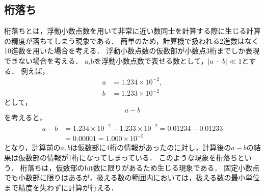 \subsection{桁落ち}
桁落ちとは，浮動小数点数を用いて非常に近い数同士を計算する際に生じる計算の精度が落ちてしまう現象である．
簡単のため，計算機で扱われる2進数はなく10進数を用いた場合を考える．
浮動小数点数の仮数部が小数点3桁までしか表現できない場合を考える．
a,bを浮動小数点数で表せる数として，$|a - b| \ll 1$とする．
例えば，
\begin{align*}
    a &= 1.234 \times 10^{-2}, \\
    b &= 1.233 \times 10^{-2}
\end{align*}
として，
\begin{equation*}
    a - b
\end{equation*}
を考えると，
\begin{align*}
    a - b &= 1.234 \times 10^{-2} - 1.233 \times 10^{-2} = 0.01234 - 0.01233 \\
    &= 0.00001 = 1.000 \times 10^{-5}
\end{align*}
となり，計算前の$a,b$は仮数部に4桁の情報があったのに対し，計算後の$a-b$の結果は仮数部の情報が1桁になってしまっている．
このような現象を桁落ちという．
桁落ちは，仮数部のbit数に限りがあるため生じる現象である．
固定小数点でも小数部に限りはあるが，扱える数の範囲内においては，扱える数の最小単位まで精度を失わずに計算が行える．

\begin{comment}
    \section{先行研究との違い}
    先行研究では，小数部が11bitの固定小数点を用いて，浮動小数点よりも速い計算時間で連立方程式や高次方程式の近似解を求めるている\cite{IJERTV12IS010134}．
    しかし，\cite{IJERTV12IS010134}において，精度に関しては浮動小数点の方が精度が高いことも示されている．
    また，32bitの固定小数点を用いて微分方程式を解き32bitの単精度浮動小数点(Float32)と比較し，浮動小数点よりも精度の良い結果を得られることが示されている\cite{hopkins2020stochastic}．
    \cite{hopkins2020stochastic}では，計算時に計算機にかかる負荷が固定小数点の方が浮動小数点比べ低いことは示唆されているが，使用した固定小数点はISO18037の規格に従った数値型(s16.15,u0.32,s0.31,s8.7,u0.16,s0.15)であり，いずれも32bit以下の固定小数点である．
    現在，多くのプログラミング言語では通常使われる浮動小数点は64bitの倍精度浮動小数点(Float64)であり，32bitの単精度浮動小数点(Float32)よりも精度が高い計算が行える．
    そこで，倍精度浮動小数点(Float64)と同じ64bitの固定小数点を用い，また演算が行える範囲内で最大限小数部のbit数を増やすことによって倍精度浮動小数点(Float64)よりも計算の精度を高めることができるのではないかと考える．
    固定小数点を用いた計算をサポートしている言語(C,C++等)はまだ少なく，多くの数値計算では浮動小数点を用いるのが一般的であるが，将来的に固定小数点での演算のために最適化された計算機やプログラミング言語の開発が行なわれれば，固定小数点を用いた計算負荷が少なく計算時間が短く浮動小数点よりも精度の高い計算を行えることが可能になるのではないかと考える．
\end{comment}


